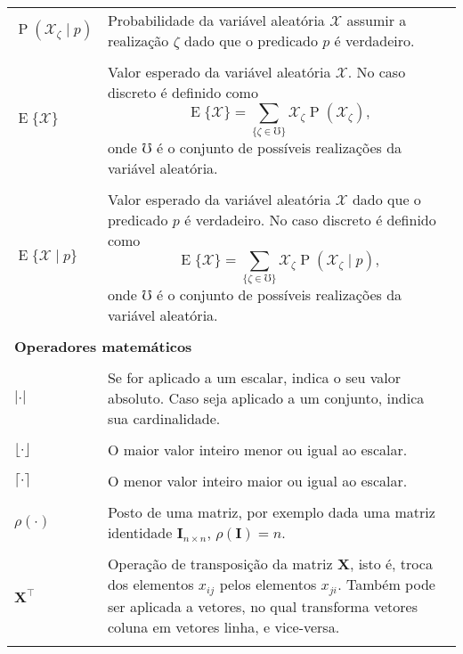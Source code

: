 \begin{longtable}{p{1in}p{4.5in}}
$\operatorname{P}(\mathcal{X}_\zeta\mid p)$ \dotfill &
\index{probabilidade!condicional}%
\index{$\operatorname{P}(\mathcal{X}_\zeta\mid p)$}%
Probabilidade da variável aleatória $\mathcal{X}$ assumir a realização $\zeta$
dado que o predicado $p$ é verdadeiro.
\tabularnewline
\tabularnewline

$\operatorname{E}\{\mathcal{X}\}$ \dotfill &
\index{valor esperado}%
\index{$\operatorname{E}\{\mathcal{X}\}$}%
Valor esperado da variável aleatória $\mathcal{X}$.
No caso discreto é definido como
\begin{equation*}
\operatorname{E}\{\mathcal{X}\}=
    \sum_{\{\zeta \in \mho\}}
        \mathcal{X}_\zeta \operatorname{P}(\mathcal{X}_\zeta)\text{,}
\end{equation*}
onde $\mho$ é o conjunto de possíveis realizações da variável aleatória.
\tabularnewline
\tabularnewline

$\operatorname{E}\{\mathcal{X}\mid p\}$ \dotfill &
Valor esperado da variável aleatória $\mathcal{X}$ dado que o predicado $p$
é verdadeiro.
No caso discreto é definido como
\begin{equation*}
\operatorname{E}\{\mathcal{X}\}=
    \sum_{\{\zeta \in \mho\}}
        \mathcal{X}_\zeta \operatorname{P}(\mathcal{X}_\zeta\mid p)\text{,}
\end{equation*}
onde $\mho$ é o conjunto de possíveis realizações da variável aleatória.
\tabularnewline
\tabularnewline

\multicolumn{2}{l}{\bf Operadores matemáticos}
\tabularnewline
\tabularnewline

$|\cdot|$ \dotfill &
\index{valor absoluto}%
\index{cardinalidade}%
Se for aplicado a um escalar, indica o seu valor absoluto.
Caso seja aplicado a um conjunto, indica sua cardinalidade.
\tabularnewline
\tabularnewline

$\lfloor\cdot\rfloor$ \dotfill &
O maior valor inteiro menor ou igual ao escalar.
\tabularnewline
\tabularnewline

$\lceil\cdot\rceil$ \dotfill &
O menor valor inteiro maior ou igual ao escalar.
\tabularnewline
\tabularnewline

$\rho(\cdot)$ \dotfill &
\index{$\rho(\cdot)$}%
\index{posto}%
\index{matriz!posto da}%
Posto de uma matriz, por exemplo dada uma matriz identidade
$\mathbf{I}_{n \times n}$, $\rho(\mathbf{I})=n$.
\tabularnewline
\tabularnewline

$\mathbf{X}^\intercal$ \dotfill &
\index{matriz!transposta}%
Operação de transposição da matriz $\mathbf{X}$, isto é, troca dos elementos
$x_{ij}$ pelos elementos $x_{ji}$.
Também pode ser aplicada a vetores, no qual transforma vetores coluna em
vetores linha, e vice-versa.
\tabularnewline
\tabularnewline


\end{longtable}
